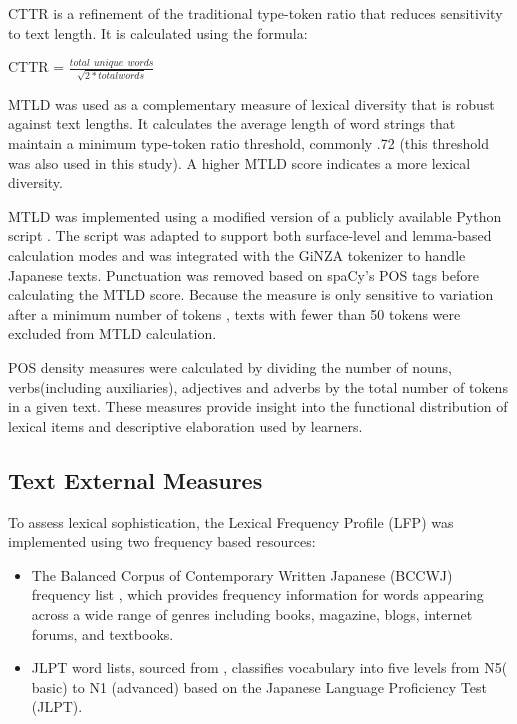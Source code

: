 CTTR is a refinement of the traditional type-token ratio that reduces sensitivity to text length. It is calculated
using the formula:
\begin{center}
    \centering CTTR = ${\displaystyle \frac{total \hspace{5pt} unique\hspace{5pt} words}{\sqrt{2*total words}} } $
    \end{center}
\vspace{5pt}

MTLD was used as a complementary measure of lexical diversity that is robust against text lengths. It calculates the
average length of word strings that maintain a minimum type-token ratio threshold, commonly .72 (this threshold was
also used in this study). A higher
MTLD
score indicates a more lexical diversity.

MTLD was implemented using a modified version of a
publicly
available
Python script \citep{MTLD_repo}. The script was adapted to support both surface-level and lemma-based calculation
modes and was integrated with the GiNZA tokenizer to handle Japanese texts. Punctuation was removed based on
spaCy's POS tags before
calculating the MTLD score. Because the measure is only sensitive to variation after a minimum number of tokens \citep{McCarthy2010},
texts with fewer than 50 tokens were excluded from MTLD calculation.

POS density measures were calculated by dividing the number of nouns, verbs(including auxiliaries), adjectives and
adverbs by the total
number of tokens in a given text. These measures provide insight into the functional distribution of lexical items and
descriptive elaboration used by learners.


\subsection{Text External Measures}
To assess lexical sophistication, the Lexical Frequency Profile (LFP) was implemented using two frequency based
resources:
\begin{itemize}
    \item The Balanced Corpus of Contemporary Written Japanese (BCCWJ) frequency list \citep{maekawa2014}, which
    provides frequency information for words appearing across a wide range of genres including books, magazine,
    blogs,
    internet
    forums, and textbooks.
    \item JLPT word lists, sourced from \citep{jisho.org}, classifies vocabulary into five levels from N5(
    basic) to N1 (advanced) based on the Japanese Language Proficiency Test (JLPT).
    \end{itemize}

